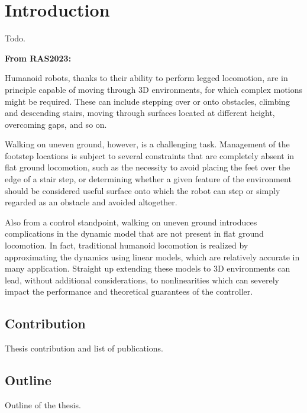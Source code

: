 \chapter{Introduction}
Todo.

\textbf{From RAS2023:}

Humanoid robots, thanks to their ability to perform legged locomotion,
are in principle capable of moving through 3D environments, for which complex
motions might be required. These can include stepping over or onto obstacles,
climbing and descending stairs, moving through surfaces located at different
height, overcoming gaps, and so on.

Walking on uneven ground, however, is a challenging task. Management of the
footstep locations is subject to several constraints that are completely absent
in flat ground locomotion, such as the necessity to avoid placing the feet over
the edge of a stair step, or determining whether a given feature of the
environment should be considered useful surface onto which the robot can
step or simply regarded as an obstacle and avoided altogether.

Also from a control standpoint, walking on uneven ground introduces
complications in the dynamic model that are not present in flat ground
locomotion. In fact, traditional humanoid locomotion is realized by
approximating the dynamics using linear models, which are relatively accurate
in many application. Straight up extending these models to 3D environments can
lead, without additional considerations, to nonlinearities which can severely
impact the performance and theoretical guarantees of the controller.


\section{Contribution}
Thesis contribution and list of publications.

\section{Outline}
Outline of the thesis.
